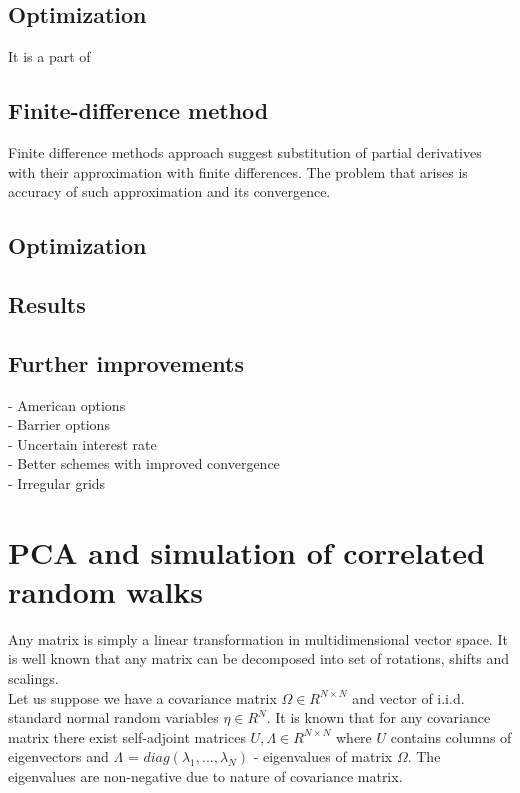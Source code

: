 \documentclass[11pt]{article} %
\begin{document}
\subsection{Optimization}
It is a part of 


\subsection{Finite-difference method}
Finite difference methods approach suggest substitution of partial derivatives with their approximation with finite differences. The problem that arises is accuracy of such approximation and its convergence.

\subsection{Optimization}

\subsection{Results}
\subsection{Further improvements}
 - American options\\
 - Barrier options\\
 - Uncertain interest rate\\
 - Better schemes with improved convergence\\
 - Irregular grids
 
\appendix

\section{PCA and simulation of correlated random walks}
\label{ap:PCA}

Any matrix is simply a linear transformation in multidimensional vector space. It is well known that any matrix can be decomposed into set of rotations, shifts and scalings. \\

Let us suppose we have a covariance matrix $\Omega \in R^{N \times N}$ and vector of i.i.d. standard normal random variables $\eta \in R^N$. It is known that for any covariance matrix there exist self-adjoint matrices $U, \Lambda \in R^{N \times N}$ where $U$ contains columns of eigenvectors and $\Lambda \text{ = } diag(\lambda_1, ..., \lambda_N)$ - eigenvalues of matrix $\Omega$. The eigenvalues are non-negative due to nature of covariance matrix.
\end{document}
